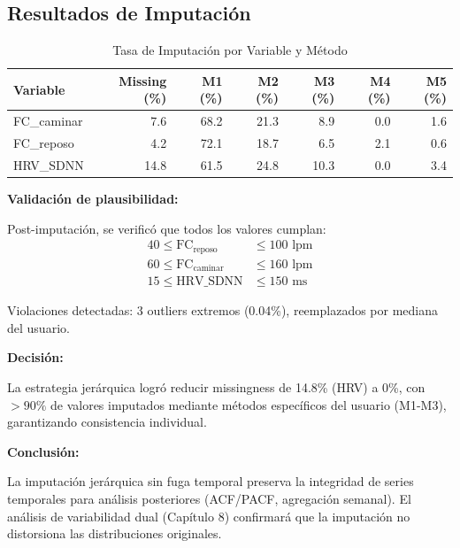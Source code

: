 \documentclass[12pt,letterpaper,twoside]{report}
\begin{document}
\subsection{Resultados de Imputación}

\begin{table}[H]
\centering
\caption{Tasa de Imputación por Variable y Método}
\label{tab:imputation_rates}
\begin{tabular}{@{}lrrrrrr@{}}
\toprule
\textbf{Variable} & \textbf{Missing (\%)} & \textbf{M1 (\%)} & \textbf{M2 (\%)} & \textbf{M3 (\%)} & \textbf{M4 (\%)} & \textbf{M5 (\%)} \\
\midrule
FC\_caminar   & 7.6 & 68.2 & 21.3 & 8.9  & 0.0 & 1.6 \\
FC\_reposo    & 4.2 & 72.1 & 18.7 & 6.5  & 2.1 & 0.6 \\
HRV\_SDNN     & 14.8 & 61.5 & 24.8 & 10.3 & 0.0 & 3.4 \\
\bottomrule
\end{tabular}
\end{table}

\begin{calculobox}
\textbf{Validación de plausibilidad:}

Post-imputación, se verificó que todos los valores cumplan:
\begin{align}
40 \leq \text{FC}_{\text{reposo}} &\leq 100 \text{ lpm} \\
60 \leq \text{FC}_{\text{caminar}} &\leq 160 \text{ lpm} \\
15 \leq \text{HRV\_SDNN} &\leq 150 \text{ ms}
\end{align}

Violaciones detectadas: 3 outliers extremos (0.04\%), reemplazados por mediana del usuario.
\end{calculobox}

\begin{decisionbox}
\textbf{Decisión:}

La estrategia jerárquica logró reducir missingness de 14.8\% (HRV) a 0\%, con $>90\%$ de valores imputados mediante métodos específicos del usuario (M1-M3), garantizando consistencia individual.
\end{decisionbox}

\begin{conclusionbox}
\textbf{Conclusión:}

La imputación jerárquica sin fuga temporal preserva la integridad de series temporales para análisis posteriores (ACF/PACF, agregación semanal). El análisis de variabilidad dual (Capítulo 8) confirmará que la imputación no distorsiona las distribuciones originales.
\end{conclusionbox}
\end{document}
